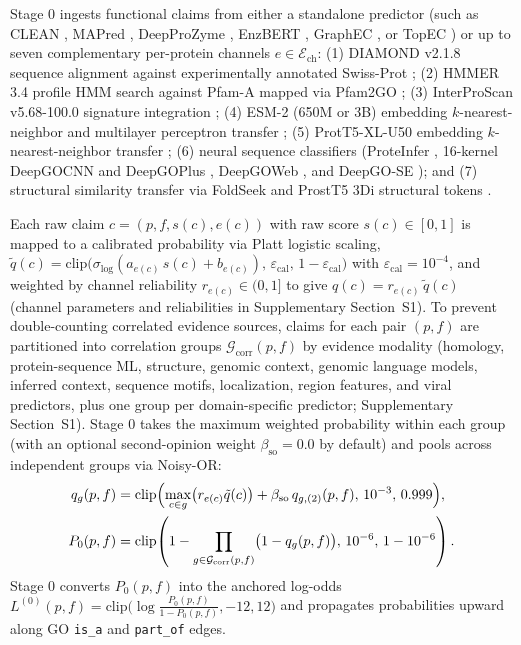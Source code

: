 \documentclass[10pt,twocolumn]{article}
\begin{document}
Stage 0 ingests functional claims from either a standalone predictor (such as CLEAN \citep{yu2023enzyme}, MAPred \citep{rong2025mapred}, DeepProZyme \citep{kim2023dpz}, EnzBERT \citep{buton2023enzbert}, GraphEC \citep{song2024accurately}, or TopEC \citep{vanderweg2025topec}) or up to seven complementary per-protein channels $e \in \mathcal{E}_{\text{ch}}$: (1) DIAMOND v2.1.8 sequence alignment against experimentally annotated Swiss-Prot \citep{buchfink2021sensitive}; (2) HMMER 3.4 profile HMM search against Pfam-A mapped via Pfam2GO \citep{eddy2011accelerated}; (3) InterProScan v5.68-100.0 signature integration \citep{jones2014interproscan}; (4) ESM-2 (650M or 3B) embedding $k$-nearest-neighbor and multilayer perceptron transfer \citep{lin2023evolutionary}; (5) ProtT5-XL-U50 embedding $k$-nearest-neighbor transfer \citep{elnaggar2021prottrans}; (6) neural sequence classifiers (ProteInfer \citep{sanderson2023proteinfer}, 16-kernel DeepGOCNN and DeepGOPlus \citep{kulmanov2020deepgoplus}, DeepGOWeb \citep{kulmanov2021deepgoweb}, and DeepGO-SE \citep{kulmanov2024deepgose}); and (7) structural similarity transfer via FoldSeek \citep{vankempen2024foldseek} and ProstT5 3Di structural tokens \citep{heinzinger2024prostt5}.

Each raw claim $c = (p, f, s(c), e(c))$ with raw score $s(c) \in [0, 1]$ is mapped to a calibrated probability via Platt logistic scaling, $\tilde{q}(c) = \text{clip}\bigl(\sigma_{\text{log}}(a_{e(c)}\, s(c) + b_{e(c)}),\, \varepsilon_{\text{cal}},\, 1 - \varepsilon_{\text{cal}}\bigr)$ with $\varepsilon_{\text{cal}} = 10^{-4}$, and weighted by channel reliability $r_{e(c)} \in (0, 1]$ to give $q(c) = r_{e(c)}\, \tilde{q}(c)$ (channel parameters and reliabilities in Supplementary Section~S1). To prevent double-counting correlated evidence sources, claims for each pair $(p, f)$ are partitioned into correlation groups $\mathcal{G}_{\text{corr}}(p, f)$ by evidence modality (homology, protein-sequence ML, structure, genomic context, genomic language models, inferred context, sequence motifs, localization, region features, and viral predictors, plus one group per domain-specific predictor; Supplementary Section~S1). Stage 0 takes the maximum weighted probability within each group (with an optional second-opinion weight $\beta_{\text{so}} = 0.0$ by default) and pools across independent groups via Noisy-OR:
\begin{equation}
  \begin{aligned}
    q_g(p, f) &= \text{clip}\Bigl(\max_{c \in g} \bigl(r_{e(c)} \tilde{q}(c)\bigr) + \beta_{\text{so}} \, q_{g,(2)}(p, f), \, 10^{-3}, \, 0.999\Bigr), \\
    P_0(p, f) &= \text{clip}\!\left(1 - \prod_{g \in \mathcal{G}_{\text{corr}}(p, f)} \bigl(1 - q_g(p, f)\bigr), \, 10^{-6}, \, 1 - 10^{-6}\right).
  \end{aligned}
  \label{eq:noisyor}
\end{equation}
Stage 0 converts $P_0(p, f)$ into the anchored log-odds $L^{(0)}(p, f) = \text{clip}\bigl(\log \frac{P_0(p, f)}{1 - P_0(p, f)}, -12, 12\bigr)$ and propagates probabilities upward along GO \texttt{is\_a} and \texttt{part\_of} edges.
\end{document}
